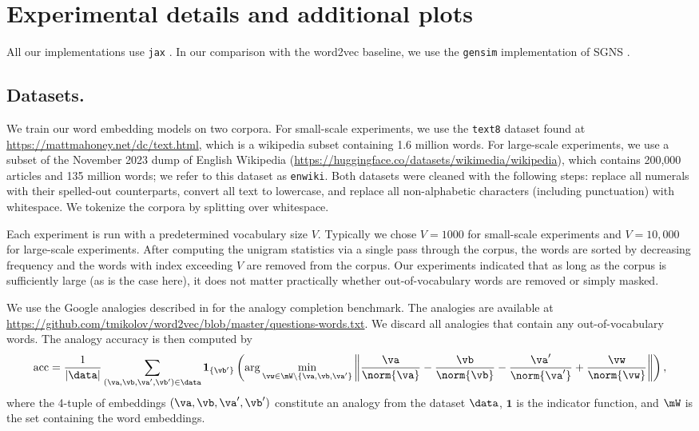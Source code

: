 \section{Experimental details and additional plots}
\label{appdx:expts}

All our implementations use \texttt{jax} \citep{jax2018github}. In our comparison with the word2vec baseline, we use the \texttt{gensim} implementation of SGNS \citep{rehurek2010software}.

\subsection{Datasets.}
We train our word embedding models on two corpora. For small-scale experiments, we use the \texttt{text8} dataset found at \url{https://mattmahoney.net/dc/text.html}, which is a wikipedia subset containing 1.6 million words. For large-scale experiments, we use a subset of the November 2023 dump of English Wikipedia (\url{https://huggingface.co/datasets/wikimedia/wikipedia}), which contains 200,000 articles and 135 million words; we refer to this dataset as  \texttt{enwiki}. Both datasets were cleaned with the following steps: replace all numerals with their spelled-out counterparts, convert all text to lowercase, and replace all non-alphabetic characters (including punctuation) with whitespace. We tokenize the corpora by splitting over whitespace.

Each experiment is run with a predetermined vocabulary size $V$. Typically we chose $V=1000$ for small-scale experiments and $V=10,000$ for large-scale experiments. After computing the unigram statistics via a single pass through the corpus, the words are sorted by decreasing frequency and the words with index exceeding $V$ are removed from the corpus. Our experiments indicated that as long as the corpus is sufficiently large (as is the case here), it does not matter practically whether out-of-vocabulary words are removed or simply masked.

We use the Google analogies described in \cite{mikolov2013distributed} for the analogy completion benchmark. The analogies are available at \url{https://github.com/tmikolov/word2vec/blob/master/questions-words.txt}. We discard all analogies that contain any out-of-vocabulary words. The analogy accuracy is then computed by
\begin{equation}
    \mathrm{acc} = \frac{1}{|\data|}\sum_{(\va,\vb,\va',\vb')\in\data}
    \mathbf{1}_{\{\vb'\}} \left(\arg\min_{\vw\in\mW\setminus\{\va,\vb,\va'\}} \left\lVert \frac{\va}{\norm{\va}} - \frac{\vb}{\norm{\vb}} - \frac{\va'}{\norm{\va'}} + \frac{\vw}{\norm{\vw}}\right\rVert\right),
\end{equation}
where the 4-tuple of embeddings $(\va,\vb,\va',\vb')$ constitute an analogy from the dataset $\data$, $\mathbf{1}$ is the indicator function, and $\mW$ is the set containing the word embeddings.

